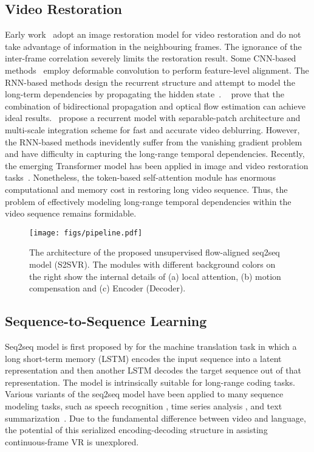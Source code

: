 \documentclass[nohyperref]{article}
\theoremstyle{plain}
\theoremstyle{definition}
\theoremstyle{remark}
\begin{document}
\subsection{Video Restoration} 
\vspace{-1mm}
Early work~\cite{r33,r35,r34} adopt an image restoration model for video restoration and do not take advantage of information in the neighbouring frames. The ignorance of the inter-frame correlation severely limits the restoration result. Some CNN-based methods~\cite{deng2020spatio,tian2018tdan} employ deformable convolution to perform feature-level alignment. The RNN-based methods design the recurrent structure and attempt to model the long-term dependencies by propagating the hidden state~\cite{r40,r24,r41}. 
~\cite{r25} prove that the combination of bidirectional propagation and optical flow estimation can achieve ideal results.~\cite{deng2021multi} propose a recurrent model with separable-patch architecture and multi-scale integration scheme for fast and accurate video deblurring. However, the RNN-based methods inevidently suffer from the vanishing gradient problem and have difficulty in capturing the long-range temporal dependencies. Recently, the emerging Transformer model has been applied in image and video restoration tasks~\cite{MST,VRT,CST,cao2021video,MST++}. Nonetheless, the token-based self-attention module has enormous computational and memory cost in restoring long video sequence. Thus, the problem of effectively modeling long-range temporal dependencies within the video sequence remains formidable.
\begin{figure*}[htp!]
    \centering
    \texttt{[image: figs/pipeline.pdf]}
    \vspace{-8mm} 
    \caption{The architecture of the proposed unsupervised flow-aligned seq2seq model (S2SVR). The modules with different background colors on the right show the internal details of (a) local attention, (b) motion compensation  and (c) Encoder (Decoder).}
    \label{pipeline}
\vspace{-3.5mm} 
\end{figure*}
\vspace{-3mm}
\subsection{Sequence-to-Sequence Learning}
\vspace{-2mm}
Seq2seq model is first proposed by \cite{r8} for the machine translation task in which a long short-term memory (LSTM) encodes the input sequence into a latent representation and then another LSTM decodes the target sequence out of that representation. The model is intrinsically suitable for long-range coding tasks. Various variants of the seq2seq model have been applied to many sequence modeling tasks, such as speech recognition \cite{r42}, time series analysis \cite{r31, r30}, and text summarization~\cite{shi2021neural}. Due to the fundamental difference between video and language, the potential of this serialized encoding-decoding structure in assisting continuous-frame VR is unexplored.
\end{document}
